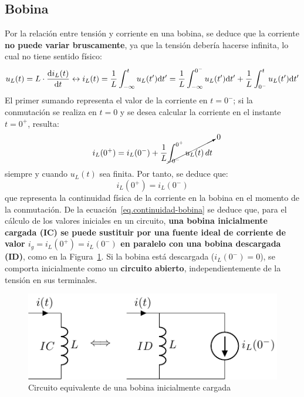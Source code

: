 \subsection{Bobina}
Por la relación entre tensión y corriente en una bobina, se deduce que
la corriente \textbf{no puede variar bruscamente}, ya que la tensión
debería hacerse infinita, lo cual no tiene sentido físico:
\begin{equation*}
  u_L(t) = L \cdot \diff{i_L(t)}{t}
  \leftrightarrow
  i_L(t) = \frac{1}{L} \int^t_{-\infty}u_L(t') \mathrm{d}t'= \frac{1}{L} \int^{0^-}_{-\infty}u_L(t')\mathrm{d}t' + \frac{1}{L} \int^{t}_{0^-}u_L(t')\mathrm{d}t'
\end{equation*}
El primer sumando representa el valor de la corriente en $t=0^-$; si
la conmutación se realiza en $t=0$ y se desea calcular la corriente en
el instante $t=0^+$, resulta:
\begin{equation*}
  i_L(0^+)=i_L(0^-)+ \dfrac{1}{L}\cancelto{0}{\int_{0^-}^{0^+} u_L(t)\, dt}
\end{equation*}
siempre y cuando $u_L(t)$ sea finita. Por tanto, se deduce que:
\begin{equation}\label{eq.continuidad-bobina}
  \boxed{i_L(0^+)=i_L(0^-)}
\end{equation}
que representa la continuidad física de la corriente en la bobina en
el momento de la conmutación. De la
ecuación~\eqref{eq.continuidad-bobina} se deduce que, para el cálculo
de los valores iniciales en un circuito, \textbf{una bobina
  inicialmente cargada (IC) se puede sustituir por una fuente ideal de
  corriente de valor $i_g=i_L(0^+)=i_L(0^-)$ en paralelo con una
  bobina descargada (ID)}, como en la
Figura~\ref{fig.condiciones_iniciales_L}. Si la bobina está descargada
($i_L(0^-)=0$), se comporta inicialmente como un \textbf{circuito
  abierto}, independientemente de la tensión en sus terminales.
\begin{figure}[H]
  \centering \includegraphics{../figs/condiciones_iniciales_L.pdf}
  \caption{Circuito equivalente de una bobina inicialmente cargada}
  \label{fig.condiciones_iniciales_L}
\end{figure}
	
